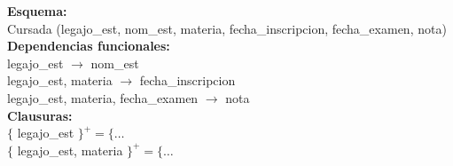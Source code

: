 \documentclass[preview]{standalone}
\begin{document}
\textbf{Esquema:}\\
Cursada (legajo\_est, nom\_est, materia, fecha\_inscripcion, fecha\_examen, nota)\\

\textbf{Dependencias funcionales:}\\
legajo\_est $\rightarrow$ nom\_est\\
legajo\_est, materia $\rightarrow$ fecha\_inscripcion\\
legajo\_est, materia, fecha\_examen $\rightarrow$ nota\\

\textbf{Clausuras:}\\
$\big\{$ legajo\_est $\big\}^+ = \big\{\dots$\\
$\big\{$ legajo\_est, materia $\big\}^+ = \big\{\dots$
\end{document}
